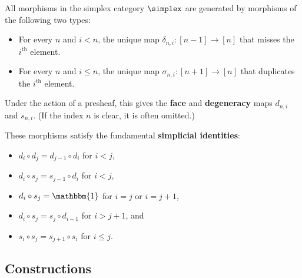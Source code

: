     \begin{property}
        All morphisms in the simplex category $\simplex$ are generated by morphisms of the following two types:
        \begin{itemize}
            \item For every $n$ and $i<n$, the unique map $\delta_{n,i}:[n-1]\rightarrow[n]$ that misses the $i^{\text{th}}$ element.
            \item For every $n$ and $i\leq n$, the unique map $\sigma_{n,i}:[n+1]\rightarrow[n]$ that duplicates the $i^{\text{th}}$ element.
        \end{itemize}
        Under the action of a presheaf, this gives the \textbf{face} and \textbf{degeneracy} maps $d_{n,i}$ and $s_{n,i}$. (If the index $n$ is clear, it is often omitted.)

        These morphisms satisfy the fundamental \textbf{simplicial identities}:
        \begin{itemize}
            \item $d_i\circ d_j = d_{j-1}\circ d_i$ for $i<j$,
            \item $d_i\circ s_j = s_{j-1}\circ d_i$ for $i<j$,
            \item $d_i\circ s_j = \mathbbm{1}$ for $i=j$ or $i=j+1$,
            \item $d_i\circ s_j = s_j\circ d_{i-1}$ for $i>j+1$, and
            \item $s_i\circ s_j = s_{j+1}\circ s_i$ for $i\leq j$.
        \end{itemize}
    \end{property}


\subsection{Constructions}

